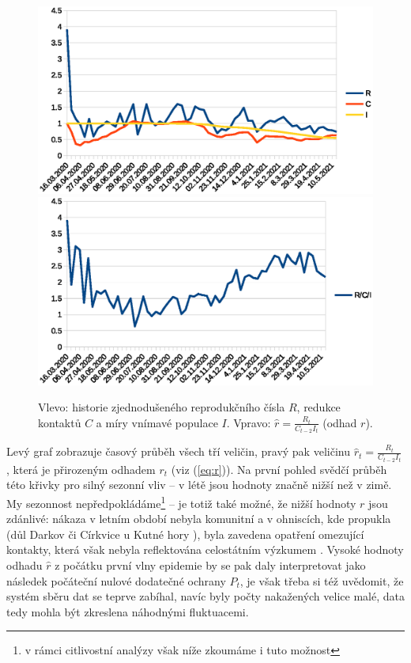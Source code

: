 \begin{figure}
\begin{center}
\includegraphics[scale=0.4]{pic/rc}\includegraphics[scale=0.4]{pic/rci}
\caption{Vlevo: historie zjednodušeného reprodukčního čísla $R$, redukce kontaktů $C$ a míry vnímavé populace $I$. Vpravo: $\hat{r} = \frac{R_{t}}{C_{t-2}I_t}$ (odhad $r$).} 
\label{fig:rci}
\end{center}
\end{figure}
Levý graf zobrazuje časový průběh všech tří veličin, pravý pak veličinu
$\hat{r}_t = \frac{R_{t}}{C_{t-2}I_{t}}$, která je přirozeným odhadem $r_{t}$
(viz (\ref{eq:r})). Na první pohled svědčí průběh této 
křivky pro silný sezonní vliv -- v létě jsou hodnoty značně
nižší než v zimě. My sezonnost nepředpokládáme\footnote{v rámci citlivostní analýzy však níže zkoumáme i tuto možnost} -- je totiž také možné, že nižší hodnoty
$r$ jsou zdánlivé: nákaza v letním období nebyla komunitní a v ohniscích,
kde propukla (důl Darkov \cite{darkov} či Církvice u Kutné hory \cite{cirkvice}),
byla zavedena opatření omezující kontakty, která však nebyla reflektována
celostátním výzkumem \cite{paqcovid}.
Vysoké hodnoty odhadu $\hat r$ z počátku první vlny
epidemie by se pak daly interpretovat jako následek počáteční nulové dodatečné
ochrany $P_{t}$, je však třeba si též uvědomit, že systém sběru
dat se teprve zabíhal, navíc byly počty nakažených velice malé, data
tedy mohla být zkreslena náhodnými fluktuacemi. 

